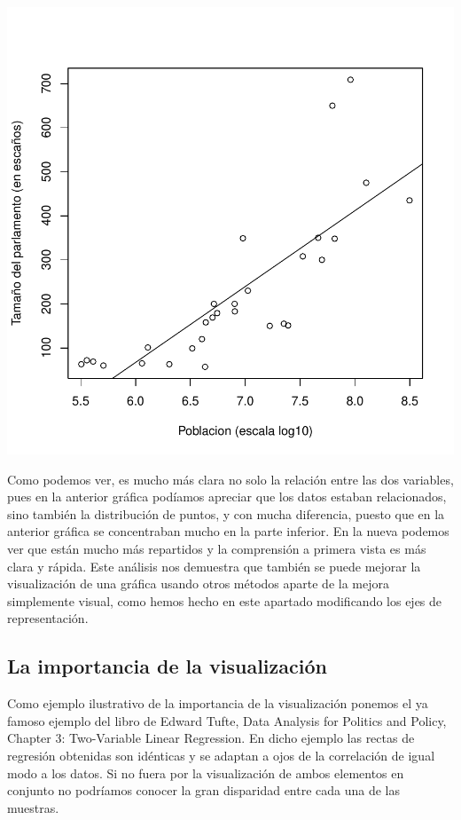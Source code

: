 \documentclass [a4paper] {article}
\begin{document}
\begin{center}
\includegraphics{entrega-plot_democracia_log}
\end{center}

Como podemos ver, es mucho más clara no solo la relación entre las dos variables, pues en la anterior gráfica 
podíamos apreciar que los datos estaban relacionados, sino también la distribución de puntos,  y con mucha diferencia,
puesto que en la anterior gráfica se concentraban mucho en la parte inferior. En la nueva podemos ver que están mucho más repartidos y la comprensión 
a primera vista es más clara y rápida. Este análisis nos demuestra que también se puede mejorar la visualización de 
una gráfica usando otros métodos aparte de la mejora simplemente visual, como hemos hecho en este apartado modificando los ejes de representación.

\subsection{La importancia de la visualización}
Como ejemplo ilustrativo de la importancia de la visualización ponemos el ya famoso ejemplo del libro de Edward Tufte, Data Analysis for Politics and Policy, Chapter 3: Two-Variable Linear Regression.
En dicho ejemplo las rectas de regresión obtenidas son idénticas y se adaptan a ojos de la correlación de igual modo a los datos.
Si no fuera por la visualización de ambos elementos en conjunto no podríamos conocer la gran disparidad entre cada una de las muestras.
\end{document}
